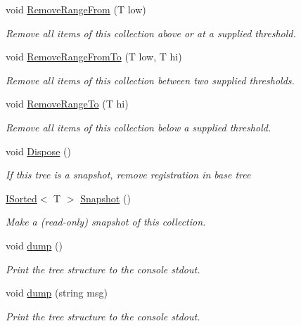\begin{DoxyCompactItemize}
void \hyperlink{class_c5_1_1_tree_bag_a566bc783eb912a68b0b731b546390347}{Remove\+Range\+From} (T low)
\begin{DoxyCompactList}\small\item\em Remove all items of this collection above or at a supplied threshold. \end{DoxyCompactList}\item 
void \hyperlink{class_c5_1_1_tree_bag_ab903b91a8b86e51adf73ea790121538a}{Remove\+Range\+From\+To} (T low, T hi)
\begin{DoxyCompactList}\small\item\em Remove all items of this collection between two supplied thresholds. \end{DoxyCompactList}\item 
void \hyperlink{class_c5_1_1_tree_bag_af07045f29933302275398a9a5337c03f}{Remove\+Range\+To} (T hi)
\begin{DoxyCompactList}\small\item\em Remove all items of this collection below a supplied threshold. \end{DoxyCompactList}\item 
void \hyperlink{class_c5_1_1_tree_bag_a76f9132f8c217a4070c2687e8ed4bc9e}{Dispose} ()
\begin{DoxyCompactList}\small\item\em If this tree is a snapshot, remove registration in base tree \end{DoxyCompactList}\item 
\hyperlink{interface_c5_1_1_i_sorted}{I\+Sorted}$<$ T $>$ \hyperlink{class_c5_1_1_tree_bag_ad7c2d8ff62d0ffb641bf2bce4d51bd3d}{Snapshot} ()
\begin{DoxyCompactList}\small\item\em Make a (read-\/only) snapshot of this collection. \end{DoxyCompactList}\item 
void \hyperlink{class_c5_1_1_tree_bag_ae4a4a11f442bc6777841fff8cbc433d4}{dump} ()
\begin{DoxyCompactList}\small\item\em Print the tree structure to the console stdout. \end{DoxyCompactList}\item 
void \hyperlink{class_c5_1_1_tree_bag_a62cc30540a8c7edcb42d734d6c562497}{dump} (string msg)
\begin{DoxyCompactList}\small\item\em Print the tree structure to the console stdout. \end{DoxyCompactList}\item 

\end{DoxyCompactItemize}
